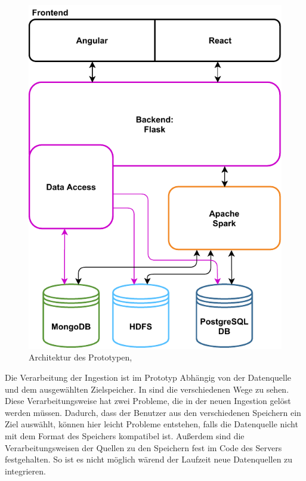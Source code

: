 \begin{figure}
    \centering
    \includegraphics{Grafiken/data_lake_prototype_arch.pdf}
    \caption{Architektur des Prototypen, }
    \label{fig:prototyp-architektur}
\end{figure}

Die Verarbeitung der Ingestion ist im Prototyp Abhängig von der Datenquelle und dem ausgewählten Zielspeicher.
In  sind die verschiedenen Wege zu sehen.
Diese Verarbeitungsweise hat zwei Probleme, die in der neuen Ingestion gelöst werden müssen.
Dadurch, dass der Benutzer aus den verschiedenen Speichern ein Ziel auswählt, können hier leicht Probleme entstehen, falls die Datenquelle nicht mit dem Format des Speichers kompatibel ist.
Außerdem sind die Verarbeitungsweisen der Quellen zu den Speichern fest im Code des Servers festgehalten.
So ist es nicht möglich wärend der Laufzeit neue Datenquellen zu integrieren.

